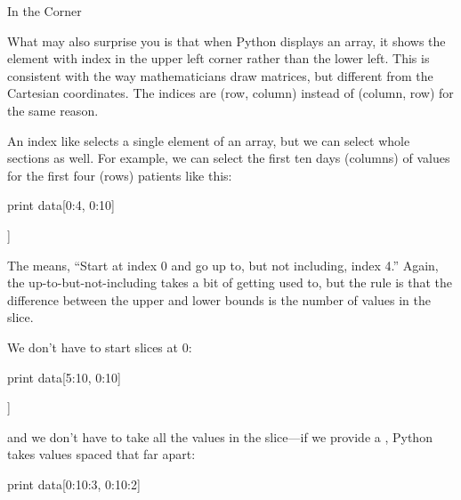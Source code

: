 \begin{swcbox}{In the Corner}

What may also surprise you is that when Python displays an array, it
shows the element with index \code{{[}0, 0{]}} in the upper left
corner rather than the lower left. This is consistent with the way
mathematicians draw matrices, but different from the Cartesian
coordinates. The indices are (row, column) instead of (column, row) for
the same reason.

\end{swcbox}

An index like \code{{[}30, 20{]}} selects a single element of an
array, but we can select whole sections as well. For example, we can
select the first ten days (columns) of values for the first four (rows)
patients like this:

\begin{VerbIn}
print data[0:4, 0:10]
\end{VerbIn}

\begin{VerbOut}
[[ 0.  0.  1.  3.  1.  2.  4.  7.  8.  3.]
 [ 0.  1.  2.  1.  2.  1.  3.  2.  2.  6.]
 [ 0.  1.  1.  3.  3.  2.  6.  2.  5.  9.]
 [ 0.  0.  2.  0.  4.  2.  2.  1.  6.  7.]]
\end{VerbOut}

The   means, ``Start at index 0 and
go up to, but not including, index 4.'' Again, the
up-to-but-not-including takes a bit of getting used to, but the rule is
that the difference between the upper and lower bounds is the number of
values in the slice.

We don't have to start slices at 0:

\begin{VerbIn}
print data[5:10, 0:10]
\end{VerbIn}

\begin{VerbOut}
[[ 0.  0.  1.  2.  2.  4.  2.  1.  6.  4.]
 [ 0.  0.  2.  2.  4.  2.  2.  5.  5.  8.]
 [ 0.  0.  1.  2.  3.  1.  2.  3.  5.  3.]
 [ 0.  0.  0.  3.  1.  5.  6.  5.  5.  8.]
 [ 0.  1.  1.  2.  1.  3.  5.  3.  5.  8.]]
\end{VerbOut}

and we don't have to take all the values in the slice---if we provide a
, Python takes values spaced that far apart:

\begin{VerbIn}
print data[0:10:3, 0:10:2]
\end{VerbIn}

